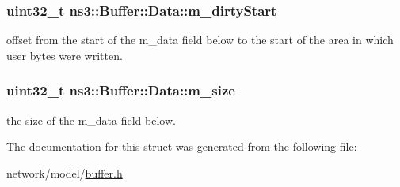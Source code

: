 \subsubsection[{\texorpdfstring{m\+\_\+dirty\+Start}{m_dirtyStart}}]{\setlength{\rightskip}{0pt plus 5cm}uint32\+\_\+t ns3\+::\+Buffer\+::\+Data\+::m\+\_\+dirty\+Start}\hypertarget{structns3_1_1Buffer_1_1Data_ac946973842bf5c652f6f1209668de0fe}{}\label{structns3_1_1Buffer_1_1Data_ac946973842bf5c652f6f1209668de0fe}
offset from the start of the m\+\_\+data field below to the start of the area in which user bytes were written. 
\subsubsection[{\texorpdfstring{m\+\_\+size}{m_size}}]{\setlength{\rightskip}{0pt plus 5cm}uint32\+\_\+t ns3\+::\+Buffer\+::\+Data\+::m\+\_\+size}\hypertarget{structns3_1_1Buffer_1_1Data_abebf3f94b05bb904b45a82a2f3193180}{}\label{structns3_1_1Buffer_1_1Data_abebf3f94b05bb904b45a82a2f3193180}
the size of the m\+\_\+data field below. 

The documentation for this struct was generated from the following file\+:\begin{DoxyCompactItemize}
\item 
network/model/\hyperlink{buffer_8h}{buffer.\+h}\end{DoxyCompactItemize}
